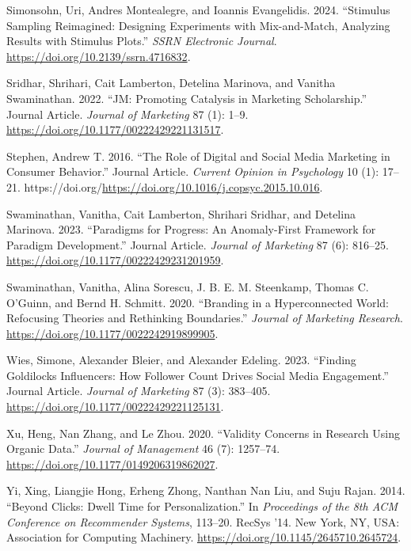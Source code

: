 \documentclass[
  a4paper,
]{scrreprt}
\newlength{\cslhangindent}
\newlength{\cslentryspacingunit} %
\newenvironment{CSLReferences}[2] %
 {%
  \setlength{\parindent}{0pt}
  \ifodd #1
  \let\oldpar\par
  \def\par{\hangindent=\cslhangindent\oldpar}
  \fi
  \setlength{\parskip}{#2\cslentryspacingunit}
 }%
 {}
\begin{document}
\begin{CSLReferences}{1}{0}
\leavevmode{}%
Simonsohn, Uri, Andres Montealegre, and Ioannis Evangelidis. 2024.
{``Stimulus Sampling Reimagined: Designing Experiments with
Mix-and-Match, Analyzing Results with Stimulus Plots.''} \emph{SSRN
Electronic Journal}. \url{https://doi.org/10.2139/ssrn.4716832}.

\leavevmode{}%
Sridhar, Shrihari, Cait Lamberton, Detelina Marinova, and Vanitha
Swaminathan. 2022. {``JM: Promoting Catalysis in Marketing
Scholarship.''} Journal Article. \emph{Journal of Marketing} 87 (1):
1--9. \url{https://doi.org/10.1177/00222429221131517}.

\leavevmode{}%
Stephen, Andrew T. 2016. {``The Role of Digital and Social Media
Marketing in Consumer Behavior.''} Journal Article. \emph{Current
Opinion in Psychology} 10 (1): 17--21.
https://doi.org/\url{https://doi.org/10.1016/j.copsyc.2015.10.016}.

\leavevmode{}%
Swaminathan, Vanitha, Cait Lamberton, Shrihari Sridhar, and Detelina
Marinova. 2023. {``Paradigms for Progress: An Anomaly-First Framework
for Paradigm Development.''} Journal Article. \emph{Journal of
Marketing} 87 (6): 816--25.
\url{https://doi.org/10.1177/00222429231201959}.

\leavevmode{}%
Swaminathan, Vanitha, Alina Sorescu, J. B. E. M. Steenkamp, Thomas C.
O'Guinn, and Bernd H. Schmitt. 2020. {``Branding in a Hyperconnected
World: Refocusing Theories and Rethinking Boundaries.''} \emph{Journal
of Marketing Research}. \url{https://doi.org/10.1177/0022242919899905}.

\leavevmode{}%
Wies, Simone, Alexander Bleier, and Alexander Edeling. 2023. {``Finding
Goldilocks Influencers: How Follower Count Drives Social Media
Engagement.''} Journal Article. \emph{Journal of Marketing} 87 (3):
383--405. \url{https://doi.org/10.1177/00222429221125131}.

\leavevmode{}%
Xu, Heng, Nan Zhang, and Le Zhou. 2020. {``Validity Concerns in Research
Using Organic Data.''} \emph{Journal of Management} 46 (7): 1257--74.
\url{https://doi.org/10.1177/0149206319862027}.

\leavevmode{}%
Yi, Xing, Liangjie Hong, Erheng Zhong, Nanthan Nan Liu, and Suju Rajan.
2014. {``Beyond Clicks: Dwell Time for Personalization.''} In
\emph{Proceedings of the 8th ACM Conference on Recommender Systems},
113--20. RecSys '14. New York, NY, USA: Association for Computing
Machinery. \url{https://doi.org/10.1145/2645710.2645724}.


\end{CSLReferences}
\end{document}
